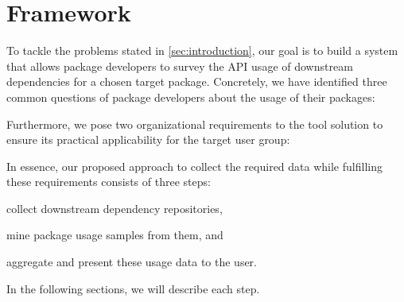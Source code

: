 \section{Framework}
\label{sec:framework}

To tackle the problems stated in \cref{sec:introduction}, our goal is to build a system that allows package developers to survey the API usage of downstream dependencies for a chosen target package.
Concretely, we have identified three common questions of package developers about the usage of their packages:


Furthermore, we pose two organizational requirements to the tool solution to ensure its practical applicability for the target user group:


In essence, our proposed approach to collect the required data while fulfilling these requirements consists of three steps:
\begin{enumerate*}[label=(\roman*)]
	\item collect downstream dependency repositories,
	\item mine package usage samples from them,
	and \item aggregate and present these usage data to the user.
\end{enumerate*}
In the following sections, we will describe each step.
